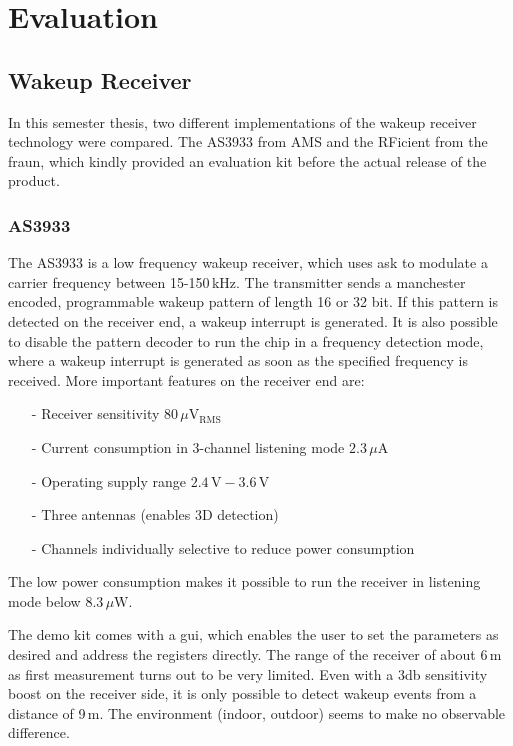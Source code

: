 \chapter{Evaluation}

\section{Wakeup Receiver}
In this semester thesis, two different implementations of the wakeup receiver technology were compared.
The AS3933 from AMS and the RFicient from the \acf{fraun}, which kindly provided an evaluation kit before the actual release of the product.

\subsection{AS3933}
The AS3933 is a low frequency wakeup receiver, which uses \acs{ask} to modulate a carrier frequency between 15-150\,kHz.
The transmitter sends a manchester encoded, programmable wakeup pattern of length 16 or 32 bit.
If this pattern is detected on the receiver end, a wakeup interrupt is generated.
It is also possible to disable the pattern decoder to run the chip in a frequency detection mode, where a wakeup interrupt is generated as soon as the specified frequency is received.
More important features on the receiver end are:
\begin{itemize}
	\item[-] Receiver sensitivity $80\,\mu\text{V$_{\text{RMS}}$}$
	\item[-] Current consumption in 3-channel listening mode $2.3\,\mu\text{A}$
	\item[-] Operating supply range $2.4\,\text{V}-3.6\,\text{V}$
	\item[-] Three antennas (enables 3D detection)
	\item[-] Channels individually selective to reduce power consumption
\end{itemize}
The low power consumption makes it possible to run the receiver in listening mode below $8.3\,\mu\text{W}$\cite{as3933}.

The demo kit comes with a \acs{gui}, which enables the user to set the parameters as desired and address the registers directly.
The range of the receiver of about 6\,m as first measurement turns out to be very limited.
Even with a 3db sensitivity boost on the receiver side, it is only possible to detect wakeup events from a distance of 9\,m.
The environment (indoor, outdoor) seems to make no observable difference.


